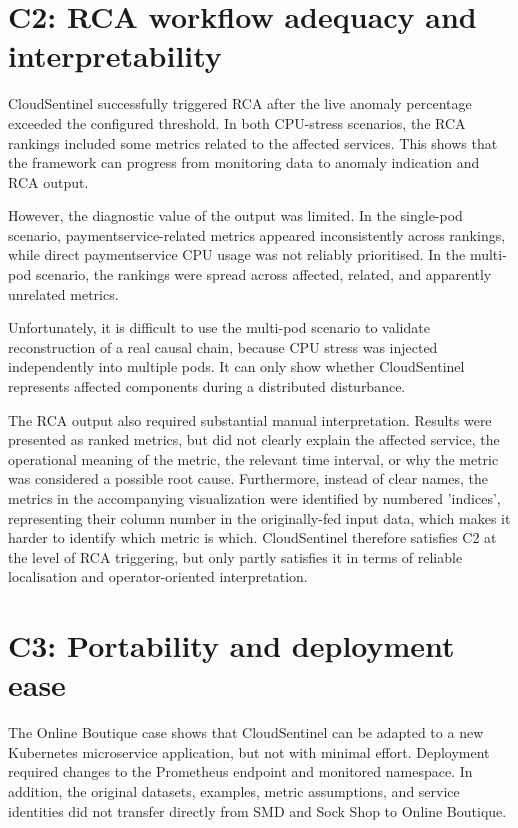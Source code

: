 \section{C2: RCA workflow adequacy and interpretability}
CloudSentinel successfully triggered RCA after the live anomaly percentage exceeded the configured threshold. In both CPU-stress scenarios, the RCA rankings included some metrics related to the affected services. This shows that the framework can progress from monitoring data to anomaly indication and RCA output.

However, the diagnostic value of the output was limited. In the single-pod scenario, paymentservice-related metrics appeared inconsistently across rankings, while direct paymentservice CPU usage was not reliably prioritised. In the multi-pod scenario, the rankings were spread across affected, related, and apparently unrelated metrics.

Unfortunately, it is difficult to use the multi-pod scenario to validate reconstruction of a real causal chain, because CPU stress was injected independently into multiple pods. It can only show whether CloudSentinel represents affected components during a distributed disturbance.

The RCA output also required substantial manual interpretation. Results were presented as ranked metrics, but did not clearly explain the affected service, the operational meaning of the metric, the relevant time interval, or why the metric was considered a possible root cause.  Furthermore, instead of clear names, the metrics in the accompanying visualization were identified by numbered 'indices', representing their column number in the originally-fed input data, which makes it harder to identify which metric is which. CloudSentinel therefore satisfies C2 at the level of RCA triggering, but only partly satisfies it in terms of reliable localisation and operator-oriented interpretation.

\section{C3: Portability and deployment ease}
The Online Boutique case shows that CloudSentinel can be adapted to a new Kubernetes microservice application, but not with minimal effort. Deployment required changes to the Prometheus endpoint and monitored namespace. In addition, the original datasets, examples, metric assumptions, and service identities did not transfer directly from SMD and Sock Shop to Online Boutique.


